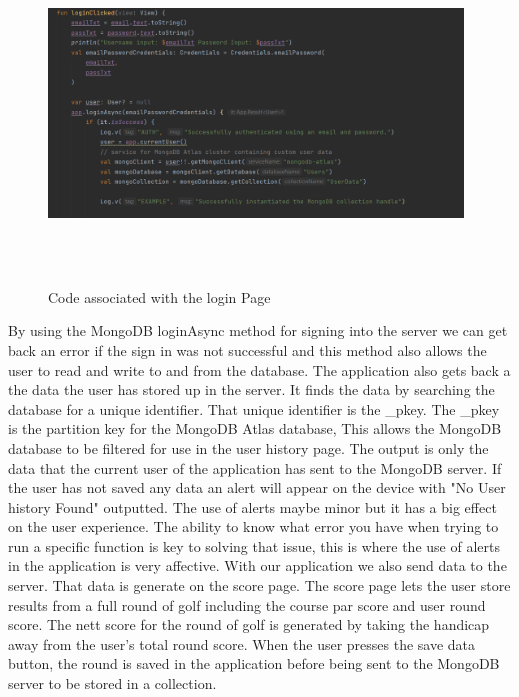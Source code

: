\begin{figure}[H]
    \centering
    \includegraphics[width=11cm, height = 9cm]{img/mongoSignIn.PNG}
    \caption{Code associated with the login Page}
    \label{fig:altas config}
\end{figure}
By using the MongoDB loginAsync method for signing into the server we can get back an error if the sign in was not successful and this method also allows the user to read and write to and from the database.
\newline
The application also gets back a the data the user has stored up in the server. It finds the data by searching the database for a unique identifier. That unique identifier is the \_pkey. The \_pkey is the partition key for the MongoDB Atlas database, This allows the MongoDB database to be filtered for use in the user history page. The output is only the data that the current user of the application has sent to the MongoDB server. \newline
If the user has not saved any data an alert will appear on the device with "No User history Found" outputted. The use of alerts maybe minor but it has a big effect on the user experience. The ability to know what error you have when trying to run a specific function is key to solving that issue, this is where the use of alerts in the application is very affective.
\newline
With our application we also send data to the server. That data is generate on the score page. The score page lets the user store results from a full round of golf including the course par score and user round score. The nett score for the round of golf is generated by taking the handicap away from the user's total round score. \newline \newline When the user presses the save data button, the round is saved in the application before being sent to the MongoDB server to be stored in a collection.
